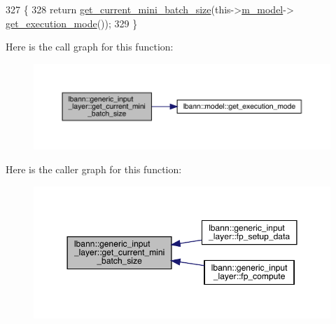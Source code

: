 \begin{DoxyCode}
327                                                   \{
328     \textcolor{keywordflow}{return} \hyperlink{classlbann_1_1generic__input__layer_a41d278999fbd10d2cd95b9af04925cf7}{get\_current\_mini\_batch\_size}(this->\hyperlink{classlbann_1_1Layer_a3d9315e99574166f2f33e37b572021d2}{m\_model}->
      \hyperlink{classlbann_1_1model_addb40597cf29aa6d31b6a7d09ef48608}{get\_execution\_mode}());
329   \}
\end{DoxyCode}
Here is the call graph for this function\+:\nopagebreak
\begin{figure}[H]
\begin{center}
\leavevmode
\includegraphics[width=350pt]{classlbann_1_1generic__input__layer_a41d278999fbd10d2cd95b9af04925cf7_cgraph}
\end{center}
\end{figure}
Here is the caller graph for this function\+:\nopagebreak
\begin{figure}[H]
\begin{center}
\leavevmode
\includegraphics[width=350pt]{classlbann_1_1generic__input__layer_a41d278999fbd10d2cd95b9af04925cf7_icgraph}
\end{center}
\end{figure}
\mbox{\label{classlbann_1_1generic__input__layer_abad654f945f62d4610f8afa597777713}} 
